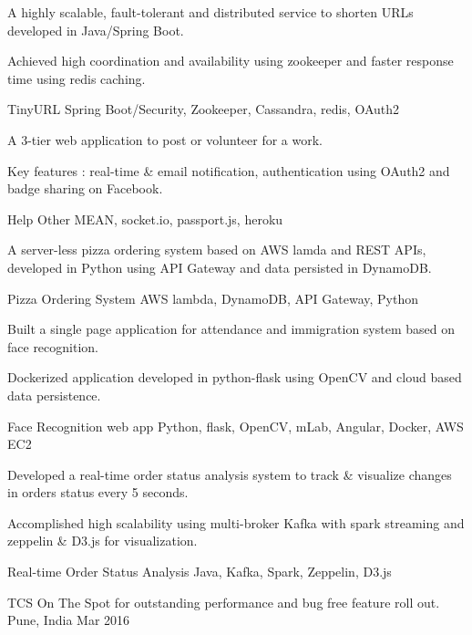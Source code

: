 \documentclass[]{awesome-cv}
\begin{document}
\vspace{-11mm}
\begin{cventries}
	\cvprojectentry
	{
	\begin{cvitems}
    	\item {A highly scalable, fault-tolerant and distributed service to shorten URLs developed in Java/Spring Boot. }
    	\item {Achieved high coordination and availability using zookeeper and faster response time using redis caching.}
	\end{cvitems}
	}
	{TinyURL}
	{Spring Boot/Security, Zookeeper, Cassandra, redis, OAuth2}
	\cvprojectentry
	{
	\begin{cvitems}
    	\item {A 3-tier web application to post or volunteer for a work.}
    	\item {Key features : real-time \& email notification, authentication using OAuth2 and badge sharing on Facebook.}
	\end{cvitems}
	}
	{Help Other}
	{MEAN, socket.io, passport.js, heroku}
	\cvprojectentry
	{
	\begin{cvitems}
    	\item {A server-less pizza ordering system based on AWS lamda and REST APIs, developed in Python using API Gateway and data persisted in DynamoDB.}
	\end{cvitems}
	}
	{Pizza Ordering System}
	{AWS lambda, DynamoDB, API Gateway, Python}
	\cvprojectentry
	{
	\begin{cvitems}
    	\item {Built a single page application for attendance and immigration system based on face recognition.}
    	\item {Dockerized application developed in python-flask using OpenCV and cloud based data persistence.}
	\end{cvitems}
	}
	{Face Recognition web app}
	{Python, flask, OpenCV, mLab, Angular, Docker, AWS EC2}
	\cvprojectentry
	{
	\begin{cvitems}
    	\item {Developed a real-time order status analysis system to track \& visualize changes in orders status every 5 seconds.}
    	\item {Accomplished high scalability using multi-broker Kafka with spark streaming and zeppelin & D3.js for visualization.}
	\end{cvitems}
	}
	{Real-time Order Status Analysis}
	{Java, Kafka, Spark, Zeppelin, D3.js}
    \vspace{-2mm}
\end{cventries}
\vspace{-3mm}
\begin{cvhonors}
	\cvhonor
	{TCS On The Spot}
	{for outstanding performance and bug free feature roll out.}
	{Pune, India}
	{Mar 2016}
\end{cvhonors}
\ 
\end{document}
